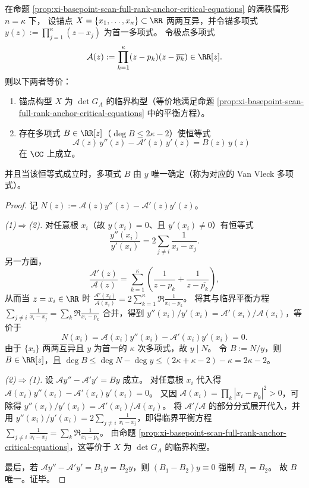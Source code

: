 \begin{proposition}\label{prop:xi-basepoint-scan-heine-stieltjes-ode}
在命题 \ref{prop:xi-basepoint-scan-full-rank-anchor-critical-equations} 的满秩情形 \(n=\kappa\) 下，
设锚点 \(X=\{x_1,\dots,x_\kappa\}\subset\RR\) 两两互异，并令锚多项式
\(
y(z):=\prod_{j=1}^{\kappa}(z-x_j)
\)
为首一多项式。
令极点多项式
\[
\mathcal{A}(z):=\prod_{k=1}^{\kappa}(z-p_k)(z-\overline{p_k})\in\RR[z].
\]
则以下两者等价：
\begin{enumerate}
\item 锚点构型 \(X\) 为 \(\det G_A\) 的临界构型（等价地满足命题 \ref{prop:xi-basepoint-scan-full-rank-anchor-critical-equations} 中的平衡方程）。
\item 存在多项式 \(B\in\RR[z]\)（\(\deg B\le 2\kappa-2\)）使恒等式
\[
\boxed{\;
\mathcal{A}(z)\,y''(z)-\mathcal{A}'(z)\,y'(z)=B(z)\,y(z)\;}
\]
在 \(\CC\) 上成立。
\end{enumerate}
并且当该恒等式成立时，多项式 \(B\) 由 \(y\) 唯一确定（称为对应的 Van Vleck 多项式）。
\end{proposition}
\begin{proof}
记
\(
N(z):=\mathcal{A}(z)y''(z)-\mathcal{A}'(z)y'(z)
\)。
\par
\emph{(1)\(\Rightarrow\)(2).}
对任意根 \(x_i\)（故 \(y(x_i)=0\)、且 \(y'(x_i)\ne 0\)）有恒等式
\[
\frac{y''(x_i)}{y'(x_i)}=2\sum_{j\ne i}\frac{1}{x_i-x_j}.
\]
另一方面，
\[
\frac{\mathcal{A}'(z)}{\mathcal{A}(z)}
=\sum_{k=1}^{\kappa}\left(\frac{1}{z-p_k}+\frac{1}{z-\overline{p_k}}\right),
\]
从而当 \(z=x_i\in\RR\) 时
\(
\frac{\mathcal{A}'(x_i)}{\mathcal{A}(x_i)}
=2\sum_{k=1}^{\kappa}\Re\frac{1}{x_i-p_k}
\)。
将其与临界平衡方程
\(
\sum_{j\ne i}\frac{1}{x_i-x_j}=\sum_{k}\Re\frac{1}{x_i-p_k}
\)
合并，得到
\(
y''(x_i)/y'(x_i)=\mathcal{A}'(x_i)/\mathcal{A}(x_i)
\)，等价于
\[
N(x_i)=\mathcal{A}(x_i)y''(x_i)-\mathcal{A}'(x_i)y'(x_i)=0.
\]
由于 \(\{x_i\}\) 两两互异且 \(y\) 为首一的 \(\kappa\) 次多项式，故 \(y\mid N\)。
令 \(B:=N/y\)，则 \(B\in\RR[z]\)，且
\(
\deg B\le \deg N-\deg y\le (2\kappa+\kappa-2)-\kappa=2\kappa-2
\)。
\par
\emph{(2)\(\Rightarrow\)(1).}
设 \(\mathcal{A}y''-\mathcal{A}'y'=By\) 成立。
对任意根 \(x_i\) 代入得
\(
\mathcal{A}(x_i)y''(x_i)-\mathcal{A}'(x_i)y'(x_i)=0
\)。
又因
\(
\mathcal{A}(x_i)=\prod_{k}|x_i-p_k|^2>0
\)，可除得
\(
y''(x_i)/y'(x_i)=\mathcal{A}'(x_i)/\mathcal{A}(x_i)
\)。
将 \(\mathcal{A}'/\mathcal{A}\) 的部分分式展开代入，并用
\(
y''(x_i)/y'(x_i)=2\sum_{j\ne i}\frac{1}{x_i-x_j}
\)，即得临界平衡方程
\(
\sum_{j\ne i}\frac{1}{x_i-x_j}=\sum_k\Re\frac{1}{x_i-p_k}
\)。
由命题 \ref{prop:xi-basepoint-scan-full-rank-anchor-critical-equations}，这等价于 \(X\) 为 \(\det G_A\) 的临界构型。
\par
最后，若 \(\mathcal{A}y''-\mathcal{A}'y'=B_1y=B_2y\)，则 \((B_1-B_2)y\equiv 0\) 强制 \(B_1=B_2\)。
故 \(B\) 唯一。证毕。
\end{proof}

